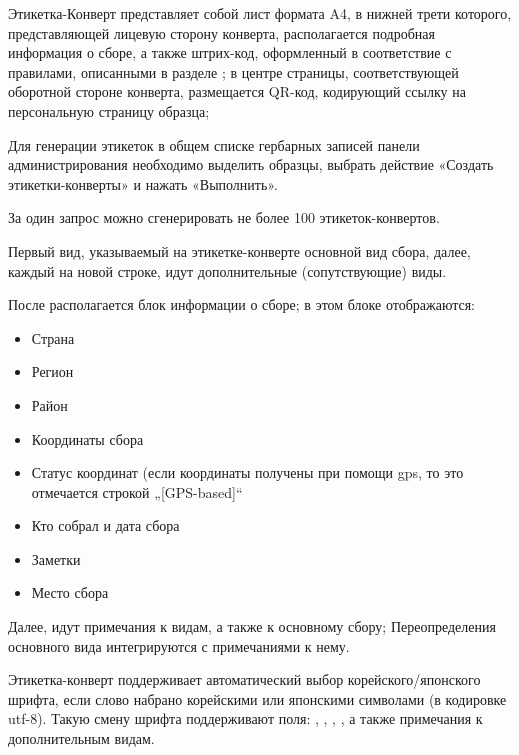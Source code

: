 \documentclass[letterpaper,10pt,russian]{sphinxmanual}
\begin{document}
Этикетка-Конверт представляет собой лист формата A4,
в нижней трети которого, представляющей
лицевую сторону конверта, располагается подробная
информация о сборе, а также штрих-код, оформленный в
соответствие с правилами, описанными в разделе
{\hyperref[\detokenize{main:id42}]{}} ; в центре страницы,
соответствующей оборотной стороне конверта, размещается
QR-код, кодирующий ссылку на персональную страницу образца;

Для генерации этикеток в общем списке гербарных записей
панели администрирования необходимо
выделить образцы, выбрать действие \textendash{} «Создать этикетки-конверты»
и нажать «Выполнить».

За один запрос можно сгенерировать не более 100 этикеток-конвертов.

Первый вид, указываемый на этикетке-конверте \textendash{} основной вид сбора,
далее, каждый на новой строке, идут дополнительные (сопутствующие) виды.

После располагается блок информации о сборе;
в этом блоке отображаются:
\begin{itemize}
\item {} 
Страна

\item {} 
Регион

\item {} 
Район

\item {} 
Координаты сбора

\item {} 
Статус координат (если координаты получены при помощи gps,
то это отмечается строкой „{[}GPS-based{]}“

\item {} 
Кто собрал и дата сбора

\item {} 
Заметки

\item {} 
Место сбора

\end{itemize}

Далее, идут примечания к видам, а также к основному сбору;
Переопределения основного вида интегрируются
с примечаниями к нему.

Этикетка-конверт поддерживает автоматический выбор корейского/японского шрифта, если
слово набрано корейскими или японскими символами (в кодировке utf-8). Такую смену шрифта
поддерживают поля: {\hyperref[\detokenize{main:id24}]{}}, {\hyperref[\detokenize{main:id25}]{}}, {\hyperref[\detokenize{main:id35}]{}}, {\hyperref[\detokenize{main:id26}]{}}, а также примечания к
дополнительным видам.
\end{document}

